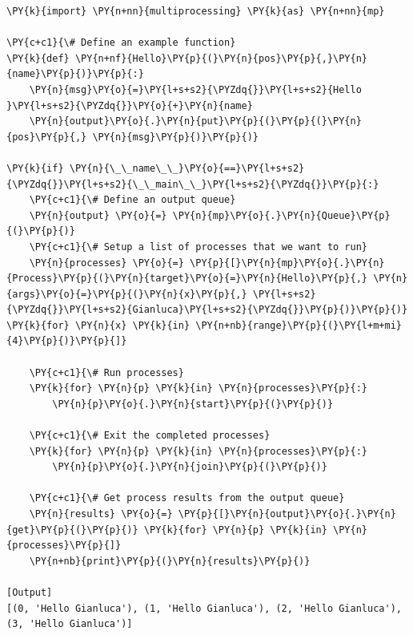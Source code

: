 \begin{Verbatim}[label=\makebox{\url{https://github.com/lucabaldini/cmepda/tree/master/slides/latex/snippets/multiprocessing_queue.py}},commandchars=\\\{\}]
\PY{k}{import} \PY{n+nn}{multiprocessing} \PY{k}{as} \PY{n+nn}{mp}

\PY{c+c1}{\# Define an example function}
\PY{k}{def} \PY{n+nf}{Hello}\PY{p}{(}\PY{n}{pos}\PY{p}{,}\PY{n}{name}\PY{p}{)}\PY{p}{:}
    \PY{n}{msg}\PY{o}{=}\PY{l+s+s2}{\PYZdq{}}\PY{l+s+s2}{Hello }\PY{l+s+s2}{\PYZdq{}}\PY{o}{+}\PY{n}{name}
    \PY{n}{output}\PY{o}{.}\PY{n}{put}\PY{p}{(}\PY{p}{(}\PY{n}{pos}\PY{p}{,} \PY{n}{msg}\PY{p}{)}\PY{p}{)}

\PY{k}{if} \PY{n}{\_\_name\_\_}\PY{o}{==}\PY{l+s+s2}{\PYZdq{}}\PY{l+s+s2}{\_\_main\_\_}\PY{l+s+s2}{\PYZdq{}}\PY{p}{:}
    \PY{c+c1}{\# Define an output queue}
    \PY{n}{output} \PY{o}{=} \PY{n}{mp}\PY{o}{.}\PY{n}{Queue}\PY{p}{(}\PY{p}{)}
    \PY{c+c1}{\# Setup a list of processes that we want to run}
    \PY{n}{processes} \PY{o}{=} \PY{p}{[}\PY{n}{mp}\PY{o}{.}\PY{n}{Process}\PY{p}{(}\PY{n}{target}\PY{o}{=}\PY{n}{Hello}\PY{p}{,} \PY{n}{args}\PY{o}{=}\PY{p}{(}\PY{n}{x}\PY{p}{,} \PY{l+s+s2}{\PYZdq{}}\PY{l+s+s2}{Gianluca}\PY{l+s+s2}{\PYZdq{}}\PY{p}{)}\PY{p}{)} \PY{k}{for} \PY{n}{x} \PY{k}{in} \PY{n+nb}{range}\PY{p}{(}\PY{l+m+mi}{4}\PY{p}{)}\PY{p}{]}
    
    \PY{c+c1}{\# Run processes}
    \PY{k}{for} \PY{n}{p} \PY{k}{in} \PY{n}{processes}\PY{p}{:}
        \PY{n}{p}\PY{o}{.}\PY{n}{start}\PY{p}{(}\PY{p}{)}

    \PY{c+c1}{\# Exit the completed processes}
    \PY{k}{for} \PY{n}{p} \PY{k}{in} \PY{n}{processes}\PY{p}{:}
        \PY{n}{p}\PY{o}{.}\PY{n}{join}\PY{p}{(}\PY{p}{)}
            
    \PY{c+c1}{\# Get process results from the output queue}
    \PY{n}{results} \PY{o}{=} \PY{p}{[}\PY{n}{output}\PY{o}{.}\PY{n}{get}\PY{p}{(}\PY{p}{)} \PY{k}{for} \PY{n}{p} \PY{k}{in} \PY{n}{processes}\PY{p}{]}
    \PY{n+nb}{print}\PY{p}{(}\PY{n}{results}\PY{p}{)}

[Output]
[(0, 'Hello Gianluca'), (1, 'Hello Gianluca'), (2, 'Hello Gianluca'), (3, 'Hello Gianluca')]
\end{Verbatim}